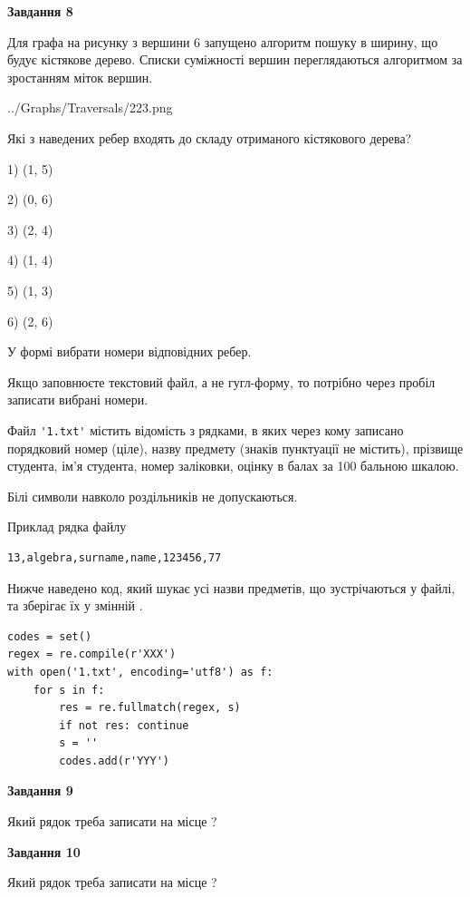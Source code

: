 \documentclass[12pt, ukrainian]{article}
\def\code#1{\Verb!#1!}
\begin{document}
{\begin {large}
{\begin {center}\textbf{Завдання 8}\end {center}}\par
Для графа на рисунку з вершини 6 запущено алгоритм пошуку в ширину, що будує кістякове дерево. Списки суміжності вершин переглядаються алгоритмом за зростанням міток вершин.\par
\begin{center}
	{../Graphs/Traversals/223.png}
\end{center}
\par Які з наведених ребер входять до складу отриманого кістякового дерева?\par
1) (1, 5)\par
2) (0, 6)\par
3) (2, 4)\par
4) (1, 4)\par
5) (1, 3)\par
6) (2, 6)\par
{\vskip 15pt} У формі вибрати номери відповідних ребер.


Якщо заповнюєте текстовий файл, а не гугл-форму, то потрібно через пробіл записа\-ти вибрані номери.\par
\newpage


Файл \code{'1.txt'} містить відомість з рядками, в яких через кому записано поряд\-ковий номер (ціле), назву предмету (знаків пунктуації не містить), прізвище студента, ім'я студента, номер заліковки, оцінку в балах за 100 бальною шкалою.

Білі символи навколо роздільників не допускаються.

Приклад рядка файлу



\begin{verbatim}
13,algebra,surname,name,123456,77
\end{verbatim}


Нижче наведено код, який шукає усі назви предметів, що зустрічаються у файлі, та зберігає їх у змінній .



\begin{verbatim}
codes = set()
regex = re.compile(r'XXX')
with open('1.txt', encoding='utf8') as f:
    for s in f:
        res = re.fullmatch(regex, s)
        if not res: continue
        s = ''
        codes.add(r'YYY')
\end{verbatim}


{\begin {center}\textbf{Завдання 9}\end {center}}\par
Який рядок треба записати на місце  ?\par
\vspace{5mm}


{\begin {center}\textbf{Завдання 10}\end {center}}\par
Який рядок треба записати на місце  ?\par


\newpage


\end {large}}
\end{document}
